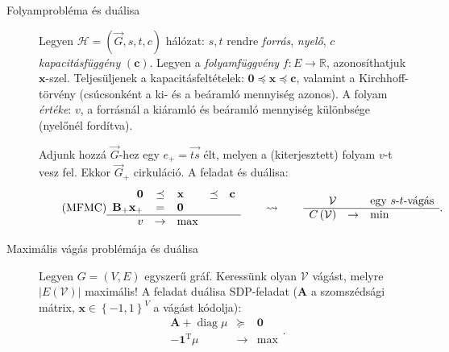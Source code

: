 \documentclass[DIV=15,appendixprefix]{scrreprt}
\theoremstyle{definition}
\theoremstyle{remark}
\DeclareMathOperator{\T}{T}
\DeclareMathOperator{\diag}{diag}
\begin{document}
%
\leavevmode
\begin{description}
	\item[Folyamprobléma és duálisa] Legyen $ \mathcal{ H } = \left( \vec{ G },{} s,{} t,{} c
		\right) $ hálózat: $ s,{} t $ rendre \emph{forrás}, \emph{nyelő}, $ c $
		\emph{kapacitásfüggény} $ \left( \mathbf{ c } \right) $. Legyen a \emph{folyamfüggvény} $ f
		\colon E \rightarrow \mathbb{ R } $, azonosíthatjuk $ \mathbf{ x } $-szel.
		Teljesüljenek a kapacitásfeltételek: $ \mathbf{ 0 } \preceq \mathbf{ x } \preceq
		\mathbf{ c } $, valamint a Kirchhoff-törvény (csúcsonként a ki- és a beáramló mennyiség
		azonos). A folyam \emph{értéke}: $ v $, a forrásnál a kiáramló és beáramló mennyiség
		különbsége (nyelőnél fordítva).

		Adjunk hozzá $ \vec{ G } $-hez egy $ e_{ + } = \overrightarrow{ t s } $ élt, melyen a
		(kiterjesztett) folyam $ v $-t vesz fel. Ekkor $ \vec{ G }_{ + } $ cirkuláció.  A feladat és
		duálisa:
		\begin{equation}\tag{MFMC}
			\begin{array}{rclcl}
				\mathbf{ 0 }							&	\preceq		&	\mathbf{ x }	&	\preceq	&	\mathbf{ c }\\
				\mathbf{ B }_{ + } \mathbf{ x }_{ + }	&	=			&	\mathbf{ 0 }	&			&	\\
				\hline
				v										&	\rightarrow	&	\max
			\end{array} \qquad \leadsto\qquad \begin{array}{rcl}
				\mathcal{ V }					&				& \text{egy $ s $-$ t $-vágás}\\
				\hline
				C \left( \mathcal{ V } \right)	&	\rightarrow	&	\min
			\end{array}.
		\end{equation}
	\item[Maximális vágás problémája és duálisa] Legyen $ G = \left( V,{} E \right) $ egyszerű gráf.
		Keressünk olyan $ \mathcal{ V } $ vágást, melyre $ \left| E \left( \mathcal{ V } \right)
		\right| $ maximális! A feladat duálisa SDP-feladat ($ \mathbf{ A } $ a szomszédsági mátrix,
		$ \mathbf{ x } \in \left\{ -1,{} 1 \right\}^{ V } $ a vágást kódolja):
		\begin{equation*}
			\begin{array}{rcl}
				\mathbf{ A } + \diag \mu 	&		\succeq	&	\mathbf{ 0 }\\
				\hline
				- \mathbf{ 1 }^{ \T } \mu	&	\rightarrow	&	\max
			\end{array}.
		\end{equation*}

\end{description}
\end{document}
